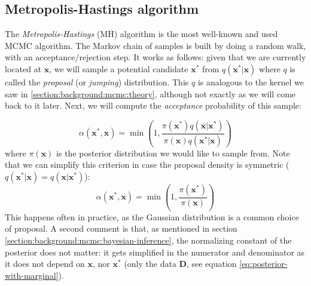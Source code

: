 \documentclass[12pt]{memoir}
\newcommand{\mb}{\mathbf}
\newcommand{\tb}{\textbf}
\newcommand{\ti}{\textit}
\begin{document}


\subsection{Metropolis-Hastings algorithm}
The \ti{Metropolis-Hastings} (MH) algorithm is the most well-known and used MCMC algorithm. The Markov chain of samples is built by doing a random walk, with an acceptance/rejection step. It works as follows: given that we are currently located at $\mb x$, we will sample a potential candidate $\mb x^*$ from $q(\mb x^*|\mb x)$ where $q$ is called the \ti{proposal} (or \ti{jumping}) distribution. This $q$ is analogous to the kernel we saw in \ref{section:background:mcmc:theory}, although not exactly as we will come back to it later. Next, we will compute the \ti{acceptance} probability of this sample:

\begin{equation}
    \alpha(\mb x^*, \mb x) = \min\left(1, \frac{\pi(\mb x^*) q(\mb x|\mb x^*)}{\pi(\mb x) q(\mb x^*|\mb x)}\right)
\end{equation}
where $\pi(\mb x)$ is the posterior distribution we would like to sample from. Note that we can simplify this criterion in case the proposal density is symmetric ($q(\mb x^*|\mb x) = q(\mb x|\mb x^*)$):
\begin{equation}
    \alpha(\mb x^*, \mb x) = \min\left(1, \frac{\pi(\mb x^*)}{\pi(\mb x)}\right)
\end{equation}
This happens often in practice, as the Gaussian distribution is a common choice of proposal.
A second comment is that, as mentioned in section \ref{section:background:mcmc:bayesian-inference}, the normalizing constant of the posterior does not matter: it gets simplified in the numerator and denominator as it does not depend on $\mb x$, nor $\mb x^*$ (only the data \tb D, see equation \ref{eq:posterior-with-marginal}). \medbreak
\end{document}
